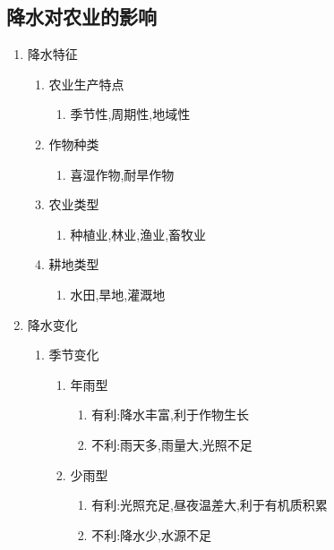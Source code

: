 \documentclass[a4paper]{article}
\begin{document}
    \subsection{降水对农业的影响}
    \begin{enumerate}
        \item 降水特征
        \begin{enumerate}
            \item 农业生产特点
            \begin{enumerate}
                \item 季节性,周期性,地域性
            \end{enumerate}
            \item 作物种类
            \begin{enumerate}
                \item 喜湿作物,耐旱作物
            \end{enumerate}
            \item 农业类型
            \begin{enumerate}
                \item 种植业,林业,渔业,畜牧业
            \end{enumerate}
            \item 耕地类型
            \begin{enumerate}
                \item 水田,旱地,灌溉地 %
            \end{enumerate}
        \end{enumerate}
        \item 降水变化
        \begin{enumerate}
            \item 季节变化
            \begin{enumerate}
                \item 年雨型
                \begin{enumerate}
                    \item 有利:降水丰富,利于作物生长
                    \item 不利:雨天多,雨量大,光照不足
                \end{enumerate}
                \item 少雨型
                \begin{enumerate}
                    \item 有利:光照充足,昼夜温差大,利于有机质积累
                    \item 不利:降水少,水源不足

\end{enumerate}
\end{enumerate}
\end{enumerate}
\end{enumerate}
\end{document}
